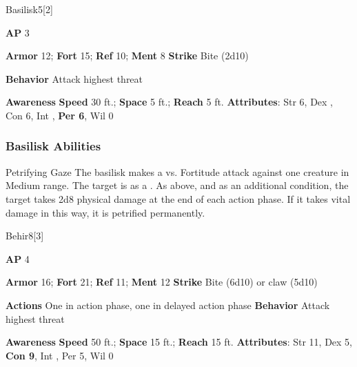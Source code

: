 \begin{monsection}{Basilisk}{5}[2]
\vspace{-1em}\vspace{-1em}
\begin{spellcontent}
\begin{spelltargetinginfo}
{\textbf{AP} 3}

\pari \textbf{Armor} 12;
\textbf{Fort} 15;
\textbf{Ref} 10;
\textbf{Ment} 8
\pari \textbf{Strike} Bite  (2d10)



\pari \textbf{Behavior} Attack highest threat
\end{spelltargetinginfo}
\end{spellcontent}

\begin{monsterfooter}
\pari \textbf{Awareness} 
\pari \textbf{Speed} 30 ft.;
\textbf{Space} 5 ft.;
\textbf{Reach} 5 ft.
\pari \textbf{Attributes}:
Str 6,
Dex ,
Con 6,
Int ,
\textbf{Per 6},
Wil 0
\end{monsterfooter}
\end{monsection}


\subsubsection{Basilisk Abilities}

\begin{ability}{Petrifying Gaze}
The basilisk makes a  vs. Fortitude attack against one creature in Medium range.
\hit The target is  as a .
\crit As above, and as an additional condition, the target takes 2d8 physical damage at the end of each action phase.
If it takes vital damage in this way, it is petrified permanently.
\end{ability}

\begin{monsection}{Behir}{8}[3]
\vspace{-1em}\vspace{-1em}
\begin{spellcontent}
\begin{spelltargetinginfo}
{\textbf{AP} 4}

\pari \textbf{Armor} 16;
\textbf{Fort} 21;
\textbf{Ref} 11;
\textbf{Ment} 12
\pari \textbf{Strike} Bite  (6d10) or claw  (5d10)


\pari \textbf{Actions} One in action phase, one in delayed action phase
\pari \textbf{Behavior} Attack highest threat
\end{spelltargetinginfo}
\end{spellcontent}

\begin{monsterfooter}
\pari \textbf{Awareness} 
\pari \textbf{Speed} 50 ft.;
\textbf{Space} 15 ft.;
\textbf{Reach} 15 ft.
\pari \textbf{Attributes}:
Str 11,
Dex 5,
\textbf{Con 9},
Int ,
Per 5,
Wil 0
\end{monsterfooter}
\end{monsection}



